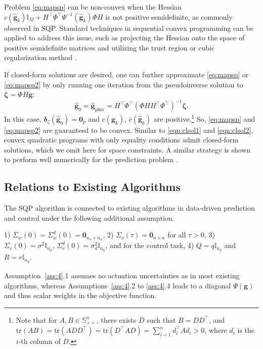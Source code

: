 \documentclass{ifacconf}
\newcommand{\tr}[1]{\mathrm{tr}\left(#1\right)}
\begin{document}
Problem \eqref{eq:mapsp} can be non-convex when the Hessian $c(\hat{\mathbf{g}}_k)\mathbb{I}_M+H^\top\Phi^\top\Psi^{-1}(\hat{\mathbf{g}}_k)\Phi H$ is not positive semidefinite, as commonly observed in SQP. Standard techniques in sequential convex programming can be applied to address this issue, such as projecting the Hessian onto the space of positive semidefinite matrices and utilizing the trust region or cubic regularization method \citep{Nesterov2006}.

If closed-form solutions are desired, one can further approximate \eqref{eq:mapsp} or \eqref{eq:mapsp2} by only running one iteration from the pseudoinverse solution to $\boldsymbol{\zeta}=\Phi H\mathbf{g}$: 
$$\hat{\mathbf{g}}_{0}=\hat{\mathbf{g}}_\mathrm{pinv}=H^\top\Phi^\top\left(\Phi HH^\top\Phi^\top\right)^{-1}\boldsymbol{\zeta}.$$
In this case, $\boldsymbol{\delta}_\zeta(\hat{\mathbf{g}}_0)=\mathbf{0}_p$ and $c(\hat{\mathbf{g}}_k)$, $\bar{c}(\hat{\mathbf{g}}_k)$ are positive.\footnote{Note that for $A,B\in\mathbb{S}^{n}_{++}$, there exists $D$ such that $B=DD^\top$, and $\tr{AB}=\tr{ADD^\top}=\tr{D^\top AD}=\sum_{i=1}^n d_i^\top A d_i>0$, where $d_i$ is the $i$-th column of $D$.} So, \eqref{eq:mapsp} and \eqref{eq:mapsp2} are guaranteed to be convex. Similar to \eqref{eqn:clsol1} and \eqref{eqn:clsol2}, convex quadratic programs with only equality conditions admit closed-form solutions, which we omit here for space constraints. A similar strategy is shown to perform well numerically for the prediction problem \citep{pmlr-v144-yin21a}.

\subsection{Relations to Existing Algorithms}
 
The SQP algorithm is connected to existing algorithms in data-driven prediction and control under the following additional assumption.
\begin{assum}
1) $\Sigma_w(0)=\Sigma_w^d(0)=\mathbf{0}_{n_u\times n_u}$, 2) $\Sigma_\nu(\tau)=\mathbf{0}_{n\times n}$ for all $\tau>0$, 3) $\Sigma_v(0)=\sigma^2\mathbb{I}_{n_y}$, $\Sigma_v^d(0)=\sigma_d^2\mathbb{I}_{n_y}$, and for the control task, 4) $Q=q\mathbb{I}_{n_y}$ and $R=r\mathbb{I}_{n_y}$. 
\label{ass:4}
\end{assum}
Assumption~\ref{ass:4}.1 assumes no actuation uncertainties as in most existing algorithms, whereas Assumptions~\ref{ass:4}.2 to \ref{ass:4}.4 leads to a diagonal $\Psi(\mathbf{g})$ and thus scalar weights in the objective function.
\end{document}
